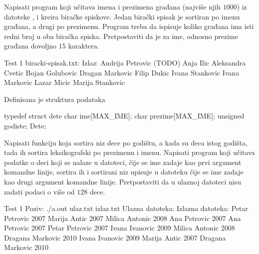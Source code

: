 \begin{Exercise}[label=509]
  Napisati program koji učitava imena i prezimena građana (najviše
  njih $1000$) iz datoteke , i kreira biračke
  spiskove. Jedan birački spisak je sortiran po imenu građana, a drugi
  po prezimenu. Program treba da ispisuje koliko građana ima isti
  redni broj u oba biračka spiska. Pretpostaviti da je za ime, odnosno
  prezime građana dovoljno $15$ karaktera.

\begin{miditest}
\begin{test}{Test 1}
biracki-spisak.txt:      Izlaz:
Andrija Petrovic         (TODO)
Anja Ilic
Aleksandra Cvetic
Bojan Golubovic
Dragan Markovic
Filip Dukic
Ivana Stankovic
Ivana Markovic
Lazar Micic
Marija Stankovic    
\end{test}
\end{miditest}
  
\end{Exercise}

\begin{Exercise}[label=510]
  Definisana je struktura podataka
\begin{ckod}
typedef struct dete
{
      char ime[MAX_IME];
      char prezime[MAX_IME];
      unsigned godiste;
} Dete;
\end{ckod}
Napisati funkciju koja sortira niz dece po godištu, a kada su deca
istog godišta, tada ih sortira leksikografski po prezimenu i
imenu. Napisati program koji učitava podatke o deci koji se nalaze u
datoteci, čije se ime zadaje kao prvi argument komandne linije,
sortira ih i sortirani niz upisuje u datoteku čije se ime zadaje kao
drugi argument komandne linije. Pretpostaviti da u ulaznoj datoteci
nisu zadati podaci o više od $128$ dece.
  
\begin{maxitest}
\begin{test}{Test 1}
Poziv: ./a.out ulaz.txt izlaz.txt
Ulazna datoteka:                 Izlazna datoteka:
Petar Petrovic 2007              Marija Antic 2007
Milica Antonic 2008              Ana Petrovic 2007
Ana Petrovic 2007                Petar Petrovic 2007
Ivana Ivanovic 2009              Milica Antonic 2008
Dragana Markovic 2010            Ivana Ivanovic 2009
Marija Antic 2007                Dragana Markovic 2010
\end{test}
\end{maxitest}
  
\end{Exercise}

